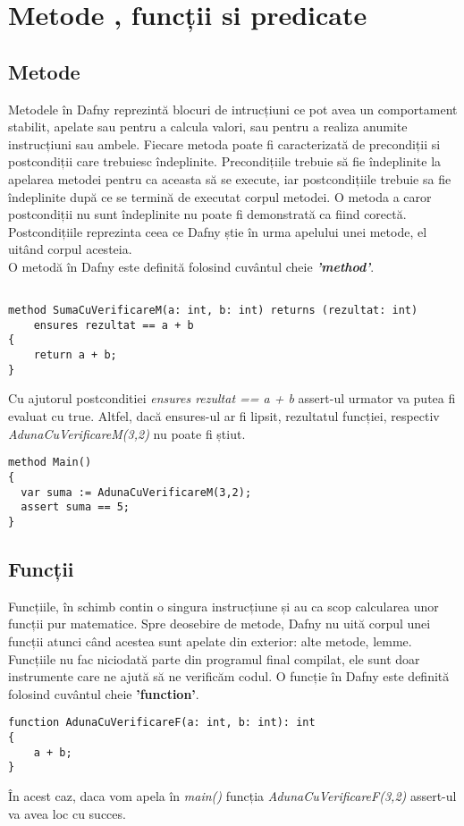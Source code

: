 \section {Metode , funcții si predicate}
\subsection{Metode}
Metodele în Dafny reprezintă blocuri de intrucțiuni ce pot avea un comportament stabilit, apelate sau pentru a calcula valori, sau pentru a realiza anumite instrucțiuni sau ambele. Fiecare metoda poate fi caracterizată de precondiții si postcondiții care trebuiesc îndeplinite. Precondițiile trebuie să fie îndeplinite la apelarea metodei pentru ca aceasta să se execute, iar postcondițiile trebuie sa fie îndeplinite după ce se termină de executat corpul metodei. O metoda a caror postcondiții nu sunt îndeplinite nu poate fi demonstrată ca fiind corectă.
Postcondițiile reprezinta ceea ce Dafny știe în urma apelului unei metode, el uitând corpul acesteia.\\O metodă în Dafny este definită folosind cuvântul cheie \textbf{\textit{'method'}}.\\

\begin{verbatim}

method SumaCuVerificareM(a: int, b: int) returns (rezultat: int)
    ensures rezultat == a + b
{
    return a + b;
}
\end{verbatim}
Cu ajutorul postconditiei \textit{ensures rezultat == a + b} assert-ul urmator va putea fi evaluat cu true. Altfel, dacă ensures-ul ar fi lipsit, rezultatul funcției, respectiv \textit{AdunaCuVerificareM(3,2)} nu poate fi știut. 

\begin{verbatim}
method Main()
{
  var suma := AdunaCuVerificareM(3,2);
  assert suma == 5;
}
\end{verbatim}

\subsection{Funcții}
Funcțiile, în schimb contin o singura instrucțiune și au ca scop calcularea unor funcții pur matematice. Spre deosebire de metode, Dafny nu uită corpul unei funcții atunci când acestea sunt apelate din exterior: alte metode, lemme. Funcțiile nu fac niciodată parte din programul final compilat, ele sunt doar instrumente care ne ajută să ne verificăm codul. O funcție în Dafny este definită folosind cuvântul cheie \textbf{'function'}.
\begin{verbatim}
function AdunaCuVerificareF(a: int, b: int): int
{
    a + b;
}
\end{verbatim}
În acest caz, daca vom apela în \textit{main()} funcția \textit{AdunaCuVerificareF(3,2)} assert-ul va avea loc cu succes. 

